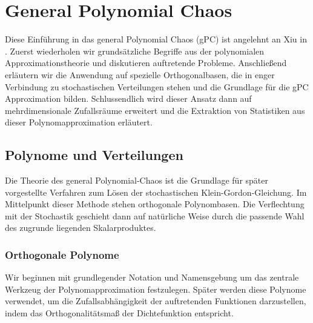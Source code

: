 
\chapter{General Polynomial Chaos}
\label{Chapter3}
Diese Einführung in das general Polynomial Chaos (gPC) ist angelehnt an Xiu in \autocite{dongbinxiu2010}. Zuerst wiederholen wir grundsätzliche Begriffe aus der polynomialen Approximationstheorie und diskutieren auftretende Probleme. Anschließend erläutern wir die Anwendung auf spezielle Orthogonalbasen, die in enger Verbindung zu stochastischen Verteilungen stehen und die Grundlage für die gPC Approximation bilden. Schlussendlich wird dieser Ansatz dann auf mehrdimensionale Zufallsräume erweitert und die Extraktion von Statistiken aus dieser Polynomapproximation erläutert.
\section{Polynome und Verteilungen}
Die Theorie des general Polynomial-Chaos ist die Grundlage für später vorgestellte Verfahren zum Lösen der stochastischen Klein-Gordon-Gleichung. Im Mittelpunkt dieser Methode stehen orthogonale Polynombasen. Die Verflechtung mit der Stochastik geschieht dann auf natürliche Weise durch die passende Wahl des zugrunde liegenden Skalarproduktes.
\subsection{Orthogonale Polynome}
Wir beginnen mit grundlegender Notation und Namensgebung um das zentrale Werkzeug der Polynomapproximation festzulegen. Später werden diese Polynome verwendet, um die Zufallsabhängigkeit der auftretenden Funktionen darzustellen, indem das Orthogonalitätsmaß der Dichtefunktion entspricht.

